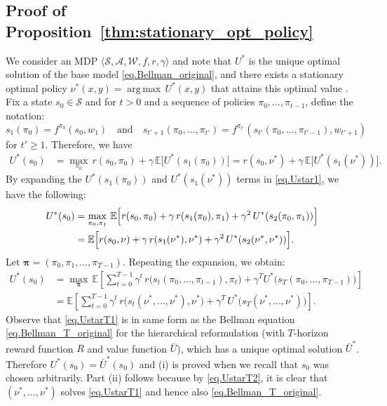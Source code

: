 \documentclass[11pt, notitlepage]{article}
\DeclareMathOperator*{\argmax}{arg\,max}
\newcommand{\E}{\mathbb{E}}
\newcommand{\1}{\mathbbm{1}}
\begin{document}
\subsection{Proof of Proposition~\ref{thm:stationary_opt_policy}}
\label{sec:stationary_opt_policy_proof}
    We consider an MDP $\langle \mathcal{S}, \mathcal{A}, \mathcal{W}, f, r, \gamma \rangle$ and note that $U^*$ is the unique optimal solution of the base model \eqref{eq.Bellman_original}, and there exists a stationary optimal policy $\nu^*(x,y)=\argmax \, U^*(x,y)$ that attains this optimal value \citep[Proposition 4.3]{bertsekas2004stochastic}. Fix a state $s_0 \in \mathcal S$ and for $t > 0$ and a sequence of policies $\pi_0, \ldots, \pi_{t-1}$, define the notation:
    \[
    s_1(\pi_0) = f^{\pi_0}(s_0, w_1) \quad \text{and} \quad s_{t'+1}(\pi_0, \ldots, \pi_{t'}) = f^{\pi_{t'}}(s_{t'}(\pi_0, \ldots, \pi_{t'-1}), w_{t'+1})
    \]
    for $t' \ge 1$. Therefore, we have
    \begin{align} 
        U^*(s_0) &= \max_{\pi_0} \, r(s_0,\pi_0) + \gamma \, \E \bigl[ U^*(s_1(\pi_0)) \bigr] =  r(s_0,\nu^*) + \gamma \, \E\bigl[ U^*(s_1(\nu^*)) \bigr] \label{eq.Ustar1}.
    \end{align}
    By expanding the $U^*(s_1(\pi_0))$ and $U^*(s_1(\nu^*))$ terms in \eqref{eq.Ustar1}, we have the following:
    \begin{equation*}
        \begin{aligned}
        U^*(s_0) &= \max_{\pi_0,\pi_1} \, \E \Bigl[ r(s_0,\pi_0) + \gamma \, r(s_1(\pi_0),\pi_1) + \gamma^2 \, U^*(s_2(\pi_0, \pi_1)) \Bigr]\\
        &= \E \Bigl[r(s_0,\nu) + \gamma \, r(s_1(\nu^*),\nu^*) + \gamma^2 \, U^*(s_2(\nu^*, \nu^*))\Bigr].
        \end{aligned}
    \end{equation*}
    Let $\boldsymbol{\pi} = (\pi_0, \pi_1, \ldots, \pi_{T-1})$. Repeating the expansion, we obtain:
    \begin{align}
        U^*(s_0) &= \max_{\boldsymbol{\pi}} \, \E \left[ \sum_{t=0}^{T-1} \gamma^t \, r\bigl(s_t(\pi_0, \ldots, \pi_{t-1}), \pi_t\bigr) + \gamma^T U^*\bigl(s_T(\pi_0, \ldots, \pi_{T-1})\bigr) \right] \label{eq.UstarT1}\\
        &= \E \left[ \sum_{t=0}^{T-1} \gamma^t \, r\bigl(s_t(\nu^*, \ldots, \nu^*),\nu^*\bigr) + \gamma^T \, U^*\bigl(s_T(\nu^*, \ldots, \nu^*)\bigr)\right]. \label{eq.UstarT2}
    \end{align}
    Observe that \eqref{eq.UstarT1} is in same form as the Bellman equation \eqref{eq.Bellman_T_original} for the hierarchical reformulation (with $T$-horizon reward function $R$ and value function $\bar{U}$), which has a unique optimal solution $\bar{U}^*$. Therefore $U^*(s_0) = \bar{U}^*(s_0)$ and (i) is proved when we recall that $s_0$ was chosen arbitrarily. Part (ii) follows because by \eqref{eq.UstarT2}, it is clear that $(\nu^*, \ldots, \nu^*)$ solves \eqref{eq.UstarT1} and hence also \eqref{eq.Bellman_T_original}.
    
\end{document}
